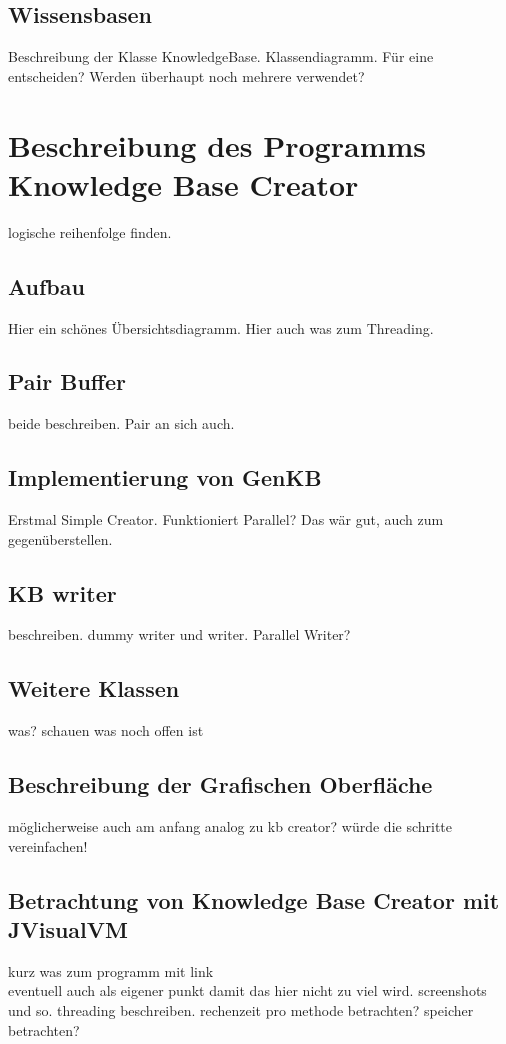 \documentclass[12pt,a4paper]{article}
\begin{document}
\subsection{Wissensbasen}
Beschreibung der Klasse KnowledgeBase. Klassendiagramm. Für eine entscheiden? Werden überhaupt noch mehrere verwendet?
\section{Beschreibung des Programms Knowledge Base Creator}
logische reihenfolge finden.
\subsection{Aufbau}

Hier ein schönes Übersichtsdiagramm. Hier auch was zum Threading.
\subsection{Pair Buffer}
beide beschreiben.  Pair an sich auch.
\subsection{Implementierung von GenKB}
Erstmal Simple Creator. Funktioniert Parallel? Das wär gut, auch zum gegenüberstellen.
\subsection{KB writer}
beschreiben. dummy writer und writer. Parallel Writer?
\subsection{Weitere Klassen}
was? schauen was noch offen ist
\subsection{Beschreibung der Grafischen Oberfläche}
möglicherweise auch am anfang analog zu kb creator? würde die schritte vereinfachen!
\subsection{Betrachtung von Knowledge Base Creator mit JVisualVM}
kurz was zum programm mit link \\
eventuell auch als eigener punkt damit das hier nicht zu viel wird. screenshots und so. threading beschreiben. rechenzeit pro methode betrachten? speicher betrachten?



\newpage

 
\end{document}
